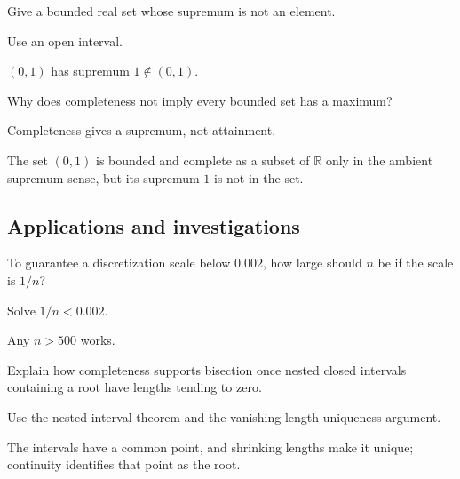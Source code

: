 \begin{exercise}\label{exr:ii01-expand-11}
Give a bounded real set whose supremum is not an element.
\end{exercise}
\begin{hint}
Use an open interval.
\end{hint}
\begin{solution}
\((0,1)\) has supremum \(1\notin(0,1)\).
\end{solution}

\begin{exercise}\label{exr:ii01-expand-12}
Why does completeness not imply every bounded set has a maximum?
\end{exercise}
\begin{hint}
Completeness gives a supremum, not attainment.
\end{hint}
\begin{solution}
The set \((0,1)\) is bounded and complete as a subset of \(\mathbb R\) only in the ambient supremum sense, but its supremum \(1\) is not in the set.
\end{solution}

\subsection*{Applications and investigations}

\begin{exercise}\label{exr:ii01-expand-13}
To guarantee a discretization scale below \(0.002\), how large should \(n\) be if the scale is \(1/n\)?
\end{exercise}
\begin{hint}
Solve \(1/n<0.002\).
\end{hint}
\begin{solution}
Any \(n>500\) works.
\end{solution}

\begin{exercise}\label{exr:ii01-expand-14}
Explain how completeness supports bisection once nested closed intervals containing a root have lengths tending to zero.
\end{exercise}
\begin{hint}
Use the nested-interval theorem and the vanishing-length uniqueness argument.
\end{hint}
\begin{solution}
The intervals have a common point, and shrinking lengths make it unique; continuity identifies that point as the root.
\end{solution}

